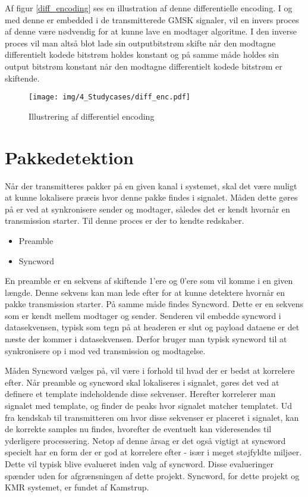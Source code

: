 \begin{appendices}
Af figur \ref{diff_encoding} ses en illustration af denne differentielle encoding. I og med denne er embedded i de transmitterede GMSK signaler, vil en invers proces af denne være nødvendig for at kunne lave en modtager algoritme. I den inverse proces vil man altså blot lade sin outputbitstrøm skifte når den modtagne differentielt kodede bitstrøm holdes konstant og på samme måde holdes sin output bitstrøm konstant når den modtagne differentielt kodede bitstrøm er skiftende. 

\begin{figure}[H]
	\centering{}
	\texttt{[image: img/4\_Studycases/diff\_enc.pdf]}
	\caption{Illustrering af differentiel encoding}
	\label{fig:diff_enc}
\end{figure} 

\pagebreak
\section{Pakkedetektion} \label{appendix::studycase::pakke_detektion}
Når der transmitteres pakker på en given kanal i systemet, skal det være muligt at kunne lokalisere præcis hvor denne pakke findes i signalet. Måden dette gøres på er ved at synkronisere sender og modtager, således det er kendt hvornår en transmission starter. Til denne proces er der to kendte redskaber.

\begin{itemize}
	\item Preamble 
	\item Syncword
\end{itemize}

En preamble er en sekvens af skiftende 1'ere og 0'ere som vil komme i en given længde. Denne sekvens kan man lede efter for at kunne detektere hvornår en pakke transmission starter. På samme måde findes Syncword. Dette er en sekvens som er kendt mellem modtager og sender. Senderen vil embedde syncword i datasekvensen, typisk som tegn på at headeren er slut og payload dataene er det næste der kommer i datasekvensen. Derfor bruger man typisk syncword til at synkronisere op i mod ved transmission og modtagelse. 

Måden Syncword vælges på, vil være i forhold til hvad der er bedst at korrelere efter. Når preamble og syncword skal lokaliseres i signalet, gøres det ved at definere et template indeholdende disse sekvenser. Herefter korrelerer man signalet med template, og finder de peaks hvor signalet matcher templatet. Ud fra kendskab til transmitteren om hvor disse sekvenser er placeret i signalet, kan de korrekte samples nu findes, hvorefter de eventuelt kan videresendes til yderligere processering. Netop af denne årsag er det også vigtigt at syncword specielt har en form der er god at korrelere efter - især i meget støjfyldte miljøer. Dette vil typisk blive evalueret inden valg af syncword. Disse evalueringer spænder uden for afgrænsningen af dette projekt. Syncword, for dette projekt og KMR systemet, er fundet af Kamstrup.


\end{appendices}
